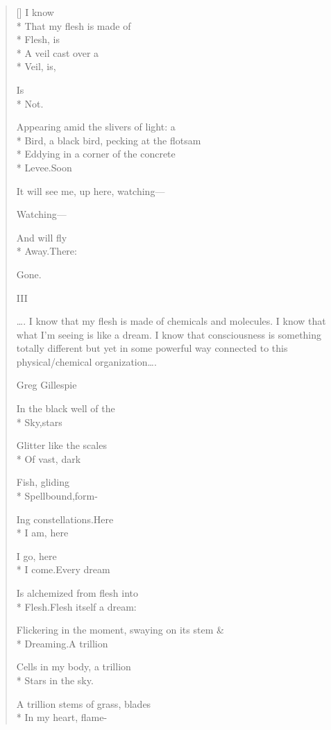 \begin{verse}[\versewidth]
I know\\*
That my flesh is made of\\*
Flesh, is\\*
A veil cast over a\\*
Veil, is,

Is\\*
Not.

\starbreak

Appearing amid the slivers of light: a\\*
Bird, a black bird, pecking at the flotsam\\*
Eddying in a corner of the concrete\\*
Levee.\qquad Soon

It will see me, up here, watching---

Watching---

And will fly\\*
Away.\qquad There:

Gone.  

\hspace{0.45\versewidth} III

\epigraph{\ldots . I know that my flesh is made of chemicals and molecules. I know that what I'm seeing is like a dream. I know that consciousness is something totally different but yet in some powerful way connected to this physical/chemical organization\ldots .}{Greg Gillespie}

In the black well of the\\*
Sky,\quad stars

Glitter like the scales\\*
Of vast, dark

Fish, gliding\\*
Spellbound,\quad form-

Ing constellations.\quad Here\\*
I am, here

I go, here\\*
I come.\quad Every dream

Is alchemized from flesh into\\*
Flesh.\quad Flesh itself a dream:

Flickering in the moment, swaying on its stem \&\\*
Dreaming.\quad A trillion

Cells in my body, a trillion\\*
Stars in the sky.

A trillion stems of grass, blades\\*
In my heart, flame-


\end{verse}
